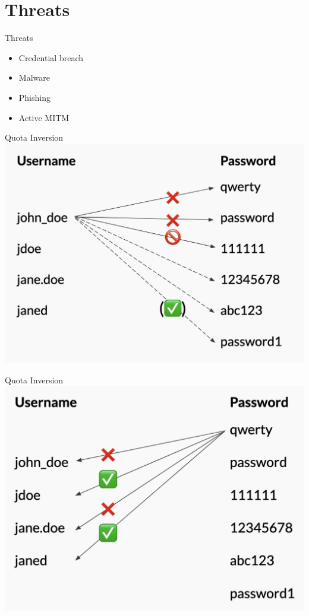 \documentclass[nobackground,dvipsnames,table]{beamer}
\begin{document}
\section{Threats}

\begin{frame}{Threats}
    \Large
    \begin{itemize}
        \item Credential breach
        \item Malware
        \item Phishing
        \item Active MITM
    \end{itemize}
\end{frame}

\begin{frame}{Quota Inversion}
    \includegraphics[width=\textwidth]{quota-inversion-1}
\end{frame}

\begin{frame}{Quota Inversion}
    \includegraphics[width=\textwidth]{quota-inversion-2}
\end{frame}
\end{document}
